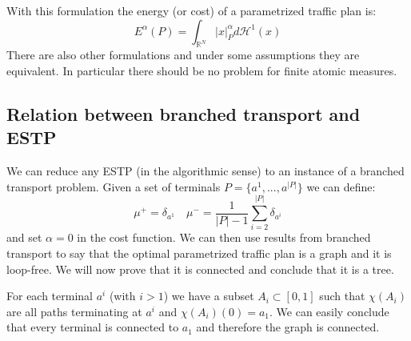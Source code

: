 With this formulation the energy (or cost) of a parametrized traffic plan is:
\begin{equation}
    E^{\alpha}(P) = \int_{\mathbb{R}^N} |x|_P^{\alpha} d \mathcal{H}^1(x)
\end{equation}
There are also other formulations and under some assumptions they are equivalent. In particular there should be no problem
for finite atomic measures.

\subsection{Relation between branched transport and ESTP}

We can reduce any ESTP (in the algorithmic sense) to an instance of a branched transport problem.
Given a set of terminals $P = \{a^1, ..., a^{|P|}\}$ we can define:
\begin{equation}
    \mu^+ = \delta_{a^1} \quad \mu^- = \frac{1}{|P| - 1}\sum_{i = 2}^{|P|} \delta_{a^i}
\end{equation}
and set $\alpha =0$ in the cost function.
We can then use results from branched transport to say that the optimal parametrized
traffic plan is a graph and it is loop-free. We will now prove that it is connected and conclude that it is a tree.

For each terminal $a^i$ (with $i>1$) we have a subset $A_i \subset [0,1]$ such that $\chi(A_i)$ are all paths terminating at $a^i$ and
$\chi(A_i)(0) = a_1$.
We can easily conclude that every terminal is connected to $a_1$ and therefore the graph is connected.

